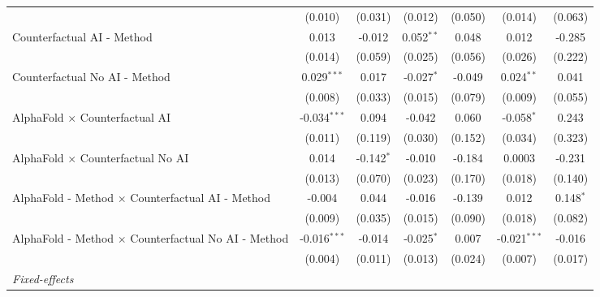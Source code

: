 \begin{tabular}{lcccccc}
                                                              & (0.010)        & (0.031)      & (0.012)       & (0.050)      & (0.014)        & (0.063)\\   
   Counterfactual AI - Method                                 & 0.013          & -0.012       & 0.052$^{**}$  & 0.048        & 0.012          & -0.285\\   
                                                              & (0.014)        & (0.059)      & (0.025)       & (0.056)      & (0.026)        & (0.222)\\   
   Counterfactual No AI - Method                              & 0.029$^{***}$  & 0.017        & -0.027$^{*}$  & -0.049       & 0.024$^{**}$   & 0.041\\   
                                                              & (0.008)        & (0.033)      & (0.015)       & (0.079)      & (0.009)        & (0.055)\\   
   AlphaFold $\times$ Counterfactual AI                       & -0.034$^{***}$ & 0.094        & -0.042        & 0.060        & -0.058$^{*}$   & 0.243\\   
                                                              & (0.011)        & (0.119)      & (0.030)       & (0.152)      & (0.034)        & (0.323)\\   
   AlphaFold $\times$ Counterfactual No AI                    & 0.014          & -0.142$^{*}$ & -0.010        & -0.184       & 0.0003         & -0.231\\   
                                                              & (0.013)        & (0.070)      & (0.023)       & (0.170)      & (0.018)        & (0.140)\\   
   AlphaFold - Method $\times$ Counterfactual AI - Method     & -0.004         & 0.044        & -0.016        & -0.139       & 0.012          & 0.148$^{*}$\\   
                                                              & (0.009)        & (0.035)      & (0.015)       & (0.090)      & (0.018)        & (0.082)\\   
   AlphaFold - Method $\times$ Counterfactual No AI - Method  & -0.016$^{***}$ & -0.014       & -0.025$^{*}$  & 0.007        & -0.021$^{***}$ & -0.016\\   
                                                              & (0.004)        & (0.011)      & (0.013)       & (0.024)      & (0.007)        & (0.017)\\   
   \midrule
   \emph{Fixed-effects}\\

\end{tabular}
